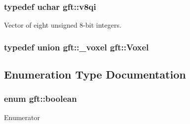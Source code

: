 \hypertarget{namespacegft_a8f84989647cef28b9a4861e651c0efd1}{
\subsubsection[{v8qi}]{\setlength{\rightskip}{0pt plus 5cm}typedef {\bf uchar} {\bf gft\-::v8qi}}}\label{namespacegft_a8f84989647cef28b9a4861e651c0efd1}


Vector of eight unsigned 8-\/bit integers. 

\hypertarget{namespacegft_a16db894075bb714f877a3c5733772db6}{
\subsubsection[{Voxel}]{\setlength{\rightskip}{0pt plus 5cm}typedef union {\bf gft\-::\-\_\-voxel}  {\bf gft\-::\-Voxel}}}\label{namespacegft_a16db894075bb714f877a3c5733772db6}


\subsection{Enumeration Type Documentation}
\hypertarget{namespacegft_a46216ea11b673fe8800c5666be2e5cc1}{
\subsubsection[{boolean}]{\setlength{\rightskip}{0pt plus 5cm}enum {\bf gft\-::boolean}}}\label{namespacegft_a46216ea11b673fe8800c5666be2e5cc1}
\begin{Desc}
\item[Enumerator]\par
\begin{description}
\item[{\em 
\hypertarget{namespacegft_a46216ea11b673fe8800c5666be2e5cc1af62c5372f4ab27de64940152597e29d9}{false}\label{namespacegft_a46216ea11b673fe8800c5666be2e5cc1af62c5372f4ab27de64940152597e29d9}
}]\item[{\em 
\hypertarget{namespacegft_a46216ea11b673fe8800c5666be2e5cc1a67a7a3b7b088c1b0b77620ff2eeb9fc3}{true}\label{namespacegft_a46216ea11b673fe8800c5666be2e5cc1a67a7a3b7b088c1b0b77620ff2eeb9fc3}
}]\end{description}
\end{Desc}


